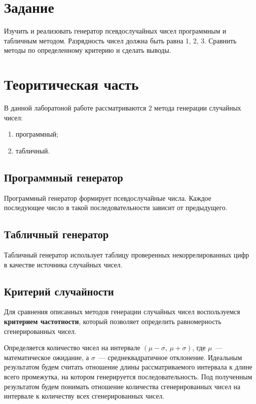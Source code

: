 \documentclass[a4paper, 12pt]{article}
\begin{document}
\section{{Задание}}

\hspace*{5mm} Изучить и реализовать генератор псевдослучайных чисел программным и табличным методом. Разрядность чисел должна быть равна 1, 2, 3. Сравнить методы по определенному критерию и сделать выводы.

\section{{Теоритическая часть}}
\hspace*{5mm} В данной лаборатоной работе рассматриваются 2 метода генерации случайных чисел:
\begin{enumerate}
	\item программный;
	\item табличный.
\end{enumerate}
\subsection{Программный генератор}
\hspace*{5mm} Программный генератор формирует псевдослучайные числа. Каждое последующее число в такой последовательности зависит от предыдущего.

\subsection{Табличный генератор}
\hspace*{5mm} Табличный генератор использует таблицу проверенных некоррелированных цифр в качестве источника случайных чисел.
\subsection{Критерий случайности}
\hspace*{5mm} Для сравнения описанных методов генерации случайных чисел воспользуемся \textbf{критерием частотности}, который позволяет определить равномерность сгенерированных чисел.

\hspace*{5mm} Определяется количество чисел на интервале $(\mu - \sigma,\ \mu + \sigma)$, где $\mu$~--- математическое ожидание, а $\sigma$~--- среднеквадратичное отклонение. Идеальным результатом будем считать отношение длины рассматриваемого интервала к длине всего промежутка, на котором генерируется последовательность. Под полученным результатом будем понимать отношение количества сгенерированных чисел на интервале к количеству всех сгенерированных чисел.
\end{document}
